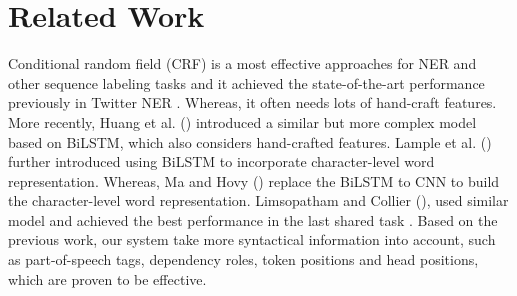 \section{Related Work}
\label{sec:related}
Conditional random field (CRF) is a most effective approaches 
\cite{DBLP:conf/icml/LaffertyMP01,DBLP:conf/conll/McCallum003}
for NER and other sequence labeling tasks and it achieved the state-of-the-art performance previously in Twitter NER  \cite{baldwin2015shared}. 
Whereas, it often needs lots of hand-craft features.
More recently, Huang et al. (\citeyear{DBLP:journals/corr/HuangXY15}) introduced a similar but more complex model based on BiLSTM, which also considers hand-crafted features. 
Lample et al. (\citeyear{DBLP:conf/naacl/LampleBSKD16}) further introduced using BiLSTM to incorporate character-level word representation. Whereas, Ma and Hovy (\citeyear{DBLP:conf/acl/MaH16}) replace the BiLSTM to CNN to build the character-level word representation. Limsopatham and Collier (\citeyear{Limsopatham2016BidirectionalLF}), used similar model and achieved the best performance in the last shared task \cite{Strauss2016ResultsOT}. 
Based on the previous work, our system take more syntactical information into account, such as part-of-speech tags, dependency roles, token positions and head positions, which are proven to be effective.
 


